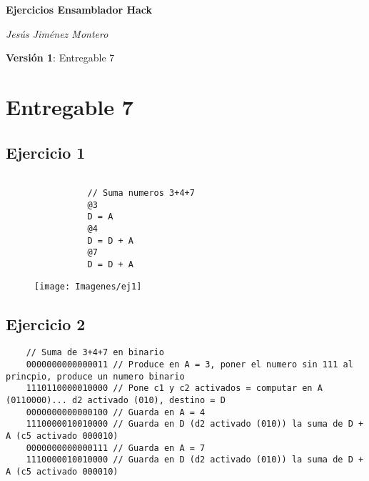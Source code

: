 \documentclass[12pt]{article}
\begin{document}
\nocite{namesans_about}
\nocite{namesans}
\nocite{namemono}


	\begin{titlepage}
		\begin{center}
			{\Huge \textbf{Ejercicios Ensamblador Hack}} 

			\vspace{2cm}

			{\Large \textit{Jesús Jiménez Montero}}

			\vspace{2cm}

			\textbf{Versión 1}: Entregable 7
		\end{center}
	\end{titlepage}

	\newpage
	\renewcommand{\contentsname}{Tabla de contenidos}
	\setcounter{secnumdepth}{5}
	\tableofcontents
	\setcounter{tocdepth}{4}
	\newpage

	\section{Entregable 7}
		\subsection{Ejercicio 1}
			\begin{lstlisting}

				// Suma numeros 3+4+7
				@3
				D = A
				@4
				D = D + A
				@7
				D = D + A
			\end{lstlisting}

			\begin{figure}[H]
				\centering
				\texttt{[image: Imagenes/ej1]}
				\label{fig:ej1}
			\end{figure}

		\newpage
		\subsection{Ejercicio 2}
			\begin{lstlisting}
	// Suma de 3+4+7 en binario
	0000000000000011 // Produce en A = 3, poner el numero sin 111 al princpio, produce un numero binario
	1110110000010000 // Pone c1 y c2 activados = computar en A (0110000)... d2 activado (010), destino = D
	0000000000000100 // Guarda en A = 4
	1110000010010000 // Guarda en D (d2 activado (010)) la suma de D + A (c5 activado 000010)
	0000000000000111 // Guarda en A = 7
	1110000010010000 // Guarda en D (d2 activado (010)) la suma de D + A (c5 activado 000010)
			\end{lstlisting}
\end{document}
